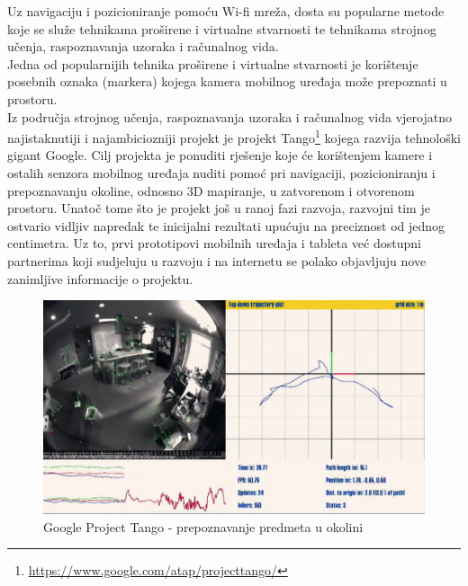 Uz navigaciju i pozicioniranje pomoću Wi-fi mreža, dosta su popularne metode koje se služe tehnikama proširene i virtualne stvarnosti te tehnikama strojnog učenja, raspoznavanja uzoraka i računalnog vida.
\\
Jedna od popularnijih tehnika proširene  i virtualne stvarnosti je korištenje posebnih oznaka (markera) kojega kamera mobilnog uređaja može prepoznati u prostoru.
\\

Iz područja strojnog učenja, raspoznavanja uzoraka i računalnog vida vjerojatno najistaknutiji i najambiciozniji projekt je projekt Tango\footnote{\url{https://www.google.com/atap/projecttango/}} kojega razvija tehnološki gigant Google. 
Cilj projekta je ponuditi rješenje koje će korištenjem kamere i ostalih senzora mobilnog uređaja nuditi pomoć pri navigaciji, pozicioniranju i prepoznavanju okoline, odnosno 3D mapiranje, u zatvorenom i otvorenom prostoru. 
Unatoč tome što je projekt još u ranoj fazi razvoja, razvojni tim je ostvario vidljiv napredak te inicijalni rezultati upućuju na preciznost od jednog centimetra. 
Uz to, prvi prototipovi mobilnih uređaja i tableta već dostupni partnerima koji sudjeluju u razvoju i na internetu se polako objavljuju nove zanimljive informacije o projektu. 

\begin{figure}[H]
    \centering
    \includegraphics[scale=0.24]{pictures/tango1}
    \caption{Google Project Tango - prepoznavanje predmeta u okolini}
\end{figure}


